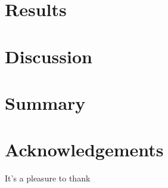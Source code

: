 \documentclass[12pt, letterpaper, preprint]{aastex}
\begin{document}
\section{Results}

\section{Discussion}

\section{Summary}


\section*{Acknowledgements}
It's a pleasure to thank 



\end{document}
